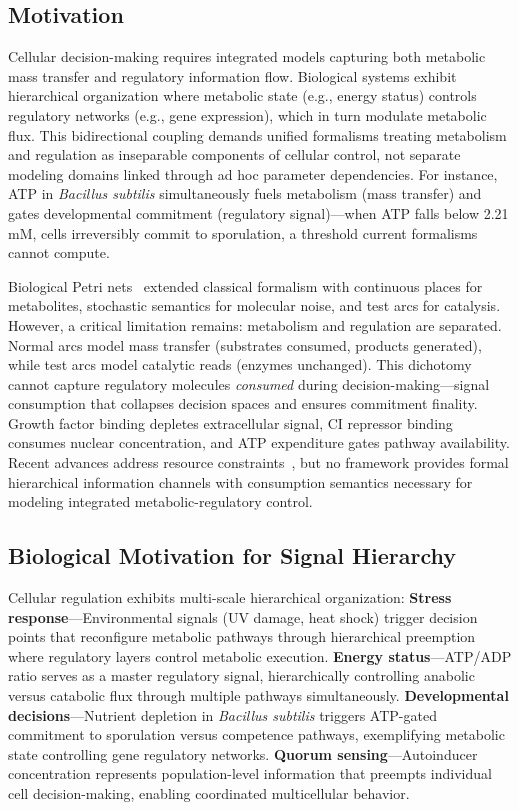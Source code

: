 
\subsection{Motivation}

Cellular decision-making requires integrated models capturing both metabolic mass transfer and regulatory information flow. Biological systems exhibit hierarchical organization where metabolic state (e.g., energy status) controls regulatory networks (e.g., gene expression), which in turn modulate metabolic flux. This bidirectional coupling demands unified formalisms treating metabolism and regulation as inseparable components of cellular control, not separate modeling domains linked through ad hoc parameter dependencies. For instance, ATP in \textit{Bacillus subtilis} simultaneously fuels metabolism (mass transfer) and gates developmental commitment (regulatory signal)---when ATP falls below 2.21 mM, cells irreversibly commit to sporulation, a threshold current formalisms cannot compute.

\noindent Biological Petri nets~\cite{reddy1993,heiner2008} extended classical formalism with continuous places for metabolites, stochastic semantics for molecular noise, and test arcs for catalysis. However, a critical limitation remains: metabolism and regulation are separated. Normal arcs model mass transfer (substrates consumed, products generated), while test arcs model catalytic reads (enzymes unchanged). This dichotomy cannot capture regulatory molecules \textit{consumed} during decision-making---signal consumption that collapses decision spaces and ensures commitment finality. Growth factor binding depletes extracellular signal, CI repressor binding consumes nuclear concentration, and ATP expenditure gates pathway availability. Recent advances address resource constraints~\cite{genovese2021}, but no framework provides formal hierarchical information channels with consumption semantics necessary for modeling integrated metabolic-regulatory control.

\subsection{Biological Motivation for Signal Hierarchy}

Cellular regulation exhibits multi-scale hierarchical organization: \textbf{Stress response}---Environmental signals (UV damage, heat shock) trigger decision points that reconfigure metabolic pathways through hierarchical preemption where regulatory layers control metabolic execution. \textbf{Energy status}---ATP/ADP ratio serves as a master regulatory signal, hierarchically controlling anabolic versus catabolic flux through multiple pathways simultaneously. \textbf{Developmental decisions}---Nutrient depletion in \textit{Bacillus subtilis} triggers ATP-gated commitment to sporulation versus competence pathways, exemplifying metabolic state controlling gene regulatory networks. \textbf{Quorum sensing}---Autoinducer concentration represents population-level information that preempts individual cell decision-making, enabling coordinated multicellular behavior.

